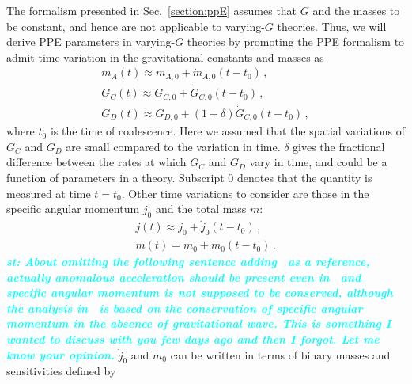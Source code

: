 \documentclass[prd,twocolumn,nofootinbib]{revtex4-1}
\newcommand\ba{\begin{eqnarray}}
\newcommand\ea{\end{eqnarray}}
\newcommand{\st}[1]{\textcolor{cyan}{\it{\textbf{st: #1}}} }
\begin{document}
The formalism presented in Sec.~\ref{section:ppE} assumes that $G$ and the masses to be constant, and hence are not applicable to varying-$G$ theories. Thus, we will derive PPE parameters in varying-$G$ theories by promoting the PPE formalism to admit time variation in the gravitational constants and masses as
 \begin{eqnarray}\label{eq:3.7a2}
 m_A(t)\approx m_{A,0}+\dot{m}_{A,0}(t-t_0)\,, \\
   \label{eq:3.7a4}  G_C(t)\approx  G_{C,0}+\dot{G}_{C,0}(t-t_0)\,, \\
   \label{eq:3.7a4-2}  G_D(t)\approx  G_{D,0}+(1+\delta)\dot{G}_{C,0}(t-t_0)\, , 
 \end{eqnarray}
where $t_0$ is the time of coalescence. Here we assumed that the spatial variations of $G_C$ and $G_D$ are small compared to the variation in time. $\delta$ gives the fractional difference between the rates at which $G_C$ and $G_D$ vary in time, and could be a function of parameters in a theory. Subscript $0$ denotes that the quantity is measured at time $t=t_0$. 
%
Other time variations to consider are those in the specific angular momentum $j_0$ and the total mass $m$:
\ba
\label{eq:3.7a3-2}  j(t)\approx j_0+\dot{j}_0(t-t_0)\,, \\
m(t)=m_0+\dot{m}_0(t-t_0)\,.
 \ea
 \st{About omitting the following sentence adding~\cite{Yagi:2011yu} as a reference, actually anomalous acceleration should be present even in~\cite{Yagi:2011yu} and specific angular momentum is not supposed to be conserved, although the analysis in~\cite{Yagi:2011yu} is based on the conservation of specific angular momentum in the absence of gravitational wave. This is something I wanted to discuss with you few days ago and then I forgot. Let me know your opinion.}
$\dot{j}_0$ and $\dot{m_0}$ can be written in terms of binary masses and sensitivities defined by
\end{document}
